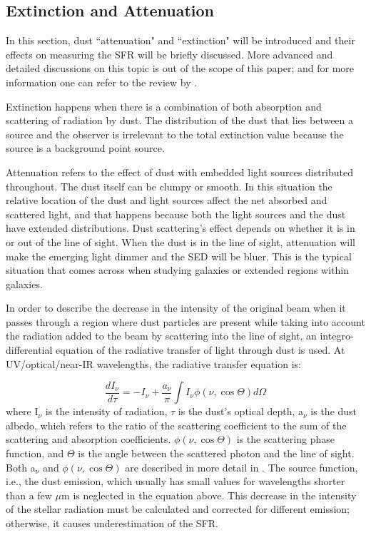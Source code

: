 \subsection{Extinction and Attenuation}
\label{sec: extinction}
In this section, dust ``attenuation" and ``extinction" will be introduced and their effects on measuring the SFR will be briefly discussed. More advanced and detailed discussions on this topic is out of the scope of this paper; and for more information one can refer to the review by \citep{Calzetti01}. 

Extinction happens when there is a combination of both absorption and scattering of radiation by dust. The distribution of the dust that lies between a source and the observer is irrelevant to the total extinction value because the source is a background point source.

Attenuation refers to the effect of dust with embedded light sources distributed throughout. The dust itself can be clumpy or smooth\citep{Calzetti13}. In this situation the relative location of the dust and light sources affect the net absorbed and scattered light, and that happens because both the light sources and the dust have extended distributions. Dust scattering's effect depends on whether it is in or out of the line of sight. When the dust is in the line of sight, attenuation will make the emerging light dimmer and the SED will be bluer. This is the typical situation that comes across when studying galaxies or extended regions within galaxies.

In order to describe the decrease in the intensity of the original beam when it passes through a region where dust particles are present while taking into account the radiation added to the beam by scattering into the line of sight, an integro-differential equation of the radiative transfer of light through dust is used. At UV/optical/near-IR wavelengths, the radiative transfer equation is:

\begin{equation}
\frac{dI_{\nu}}{d\tau} = -I_{\nu}  + \frac{a_{\nu}}{\pi} \int I_{\nu}\phi(\nu,\cos \Theta)d\Omega
\end{equation}
where I$_{\nu}$ is the intensity of radiation, $\tau$ is the dust's optical depth, a$_{\nu}$ is the dust albedo, which refers to the ratio of the scattering coefficient to the sum of the scattering and absorption coefficients. $\phi(\nu,\cos \Theta)$ is the scattering phase function, and $\Theta$ is the angle between the scattered photon and the line of sight. Both a$_{\nu}$ and $\phi(\nu,\cos \Theta)$ are described in more detail in \citep{Draine03}. The source function, i.e., the dust emission, which usually has small values for wavelengths shorter than a few $\mu$m is neglected in the equation above. This decrease in the intensity of the stellar radiation must be calculated and corrected for different emission; otherwise, it causes underestimation of the SFR. 

